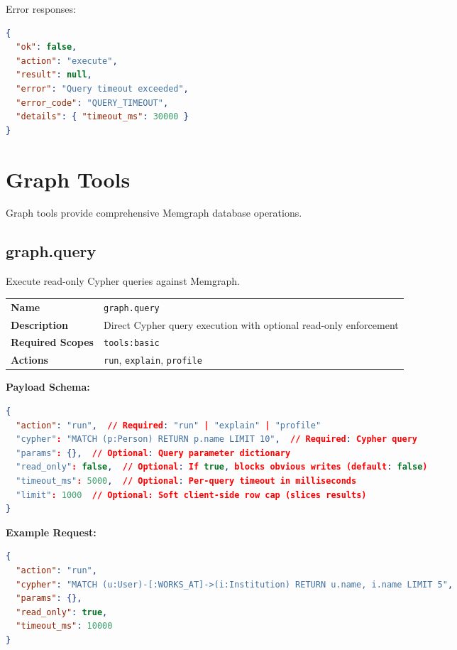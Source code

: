 Error responses:

\begin{lstlisting}[language=json]
{
  "ok": false,
  "action": "execute",
  "result": null,
  "error": "Query timeout exceeded",
  "error_code": "QUERY_TIMEOUT",
  "details": { "timeout_ms": 30000 }
}
\end{lstlisting}

\section{Graph Tools}
\label{app:tools:graph}

Graph tools provide comprehensive Memgraph database operations.

\subsection{graph.query}

Execute read-only Cypher queries against Memgraph.

\begin{table}[ht]
\centering
\small
\begin{tabularx}{\textwidth}{lX}
    \hline
    \textbf{Name} & \texttt{graph.query} \\
    \textbf{Description} & Direct Cypher query execution with optional read-only enforcement \\
    \textbf{Required Scopes} & \texttt{tools:basic} \\
    \textbf{Actions} & \texttt{run}, \texttt{explain}, \texttt{profile} \\
    \hline
\end{tabularx}
\end{table}

\textbf{Payload Schema:}
\begin{lstlisting}[language=json]
{
  "action": "run",  // Required: "run" | "explain" | "profile"
  "cypher": "MATCH (p:Person) RETURN p.name LIMIT 10",  // Required: Cypher query
  "params": {},  // Optional: Query parameter dictionary
  "read_only": false,  // Optional: If true, blocks obvious writes (default: false)
  "timeout_ms": 5000,  // Optional: Per-query timeout in milliseconds
  "limit": 1000  // Optional: Soft client-side row cap (slices results)
}
\end{lstlisting}

\textbf{Example Request:}
\begin{lstlisting}[language=json]
{
  "action": "run",
  "cypher": "MATCH (u:User)-[:WORKS_AT]->(i:Institution) RETURN u.name, i.name LIMIT 5",
  "params": {},
  "read_only": true,
  "timeout_ms": 10000
}
\end{lstlisting}


